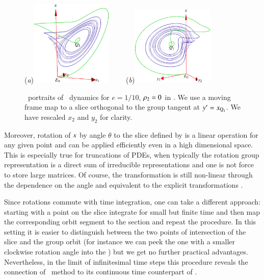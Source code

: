 \begin{figure}[ht]
\begin{center}
  (\textit{a})\includegraphics[width=0.35\textwidth,clip=true]{../figs/CLEmfReqb1}
~~~~(\textit{b})\includegraphics[width=0.35\textwidth,clip=true]{../figs/CLEmfReqb}
\end{center}
\caption{ \Statesp\
portraits of \cLe\ dynamics for $e=1/10$, $\rho_2=0$
in \reducedsp. We use a moving frame map to a slice orthogonal
to the group tangent at  ${y'}  = x_{\mathrm{Q}_{1}}$. We have rescaled $x_2$ and $y_2$
for clarity.
    }
\label{fig:CLEmfReqb1}
\end{figure}

Moreover, rotation of $x$ by angle $\theta$
to the slice defined by  is a linear operation
for any given point and can be applied efficiently
even in a high dimensional space. This is especially true
for truncations of PDEs, when typically the rotation group
representation is a direct sum of irreducible
representations and one is not force to store large matrices.
Of course, the transformation is still non-linear
through the dependence on the angle and equivalent to the
explicit transformations .


Since rotations commute with time integration, one can take a different approach:
starting with a point on the slice integrate for small but finite time and then map the
corresponding orbit segment to the section and repeat the procedure. In this setting it
is easier to distinguish between the two points of intersection of the slice and the group
orbit (for instance we can peek the one with a smaller clockwise rotation angle into the \slice)
but we get no further practical advantages. Nevertheless, in the limit of infinitesimal
time steps this procedure reveals the connection of \mframes\ method to
its continuous time counterpart of \refsect{sec:MovFrameODE}.
